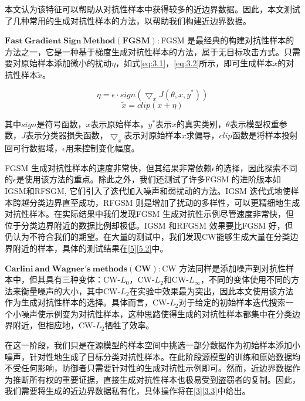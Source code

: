 本文认为该特征可以帮助从对抗性样本中获得较多的近边界数据。因此，本文测试了几种常用的生成对抗性样本的方法，以帮助我们构建近边界数据。

\noindent$\bm{Fast \ Gradient \ Sign \ Method(FGSM):}$FGSM \cite{goodfellow2014explaining}是最经典的构建对抗性样本的方法之一，它是一种基于梯度生成对抗性样本的方法，属于无目标攻击方式。只需要对原始样本添加微小的扰动$\eta$，如式\ref{eq:3.1}，\ref{eq:3.2}所示，即可生成样本$x$的对抗性样本$\tilde{x}$。

\begin{equation}
	\label{eq:3.1}
	\eta = \epsilon \cdot sign(\bigtriangledown_xJ(\theta,x,y^*))
\end{equation}
\begin{equation}
	\label{eq:3.2}
	\tilde{x} = clip(x + \eta)
\end{equation}

\noindent 其中$sign$是符号函数，$x$表示原始样本，$y^*$表示$x$的真实类别，$\theta$表示模型权重参数，$J$表示分类器损失函数，$\bigtriangledown_x$表示对原始样本$x$求偏导，$clip$函数是将样本投射回可行数据域，$\epsilon$用来控制变化幅度。

FGSM 生成对抗性样本的速度非常快，但其结果非常依赖$\epsilon$的选择，因此探索不同的$\epsilon$是使用该方法的重点。除此之外，我们还测试了许多FGSM 的进阶版本如IGSM和RFSGM, 它们引入了迭代加入噪声和弱扰动的方法。IGSM 迭代式地使样本跨越分类边界直至成功，RFGSM 则是增加了扰动的多样性，可以更精细地生成对抗性样本。在实际结果中我们发现FGSM 生成对抗性示例尽管速度非常快，但位于分类边界附近的数据比例却极低。IGSM 和RFGSM 效果要比FGSM 好，但仍认为不符合我们的期望。在大量的测试中，我们发现CW能够生成大量在分类边界附近的样本，具体的测试结果在\ref{5}\ref{5.2}中。

\noindent$\bm{Carlini \ and \ Wagner's \ methods(CW):}$CW \cite{carlini2017towards}方法同样是添加噪声到对抗性样本中，但其具有三种变体：CW-$L_0$，CW-$L_2$和CW-$L_{\infty}$，不同的变体使用不同的方法来衡量噪声的大小，其中CW-$L_2$在实验中效果最为突出，因此本文使用该方法作为生成对抗性样本的选择。具体而言，CW-$L_2$对于给定的初始样本迭代搜索一个小噪声使示例变为对抗性样本，这种思路使得生成的对抗性样本都集中在分类边界附近，但相应地，CW-$L_2$牺牲了效率。

在这一阶段，我们只是在源模型的样本空间中挑选一部分数据作为初始样本添加小噪声，针对性地生成了目标分类对抗性样本。在此阶段源模型的训练和原始数据均不受任何影响，防御者只需要针对性的生成对抗性示例即可。然而，近边界数据作为推断所有权的重要证据，直接生成对抗性样本也极易受到盗窃者的复制。因此，我们需要将生成的近边界数据私有化，具体操作将在\ref{3}\ref{3.3}中给出。

